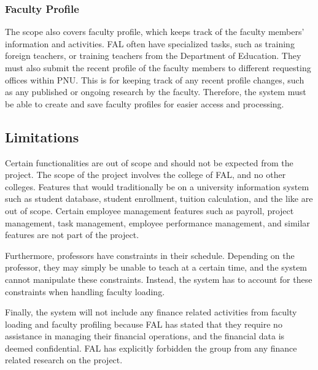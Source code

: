 \subsubsection{Faculty Profile}
The scope also covers faculty profile, which keeps track of the faculty members' information and activities. FAL often have specialized tasks, such as training foreign teachers, or training teachers from the Department of Education. They must also submit the recent profile of the faculty members to different requesting offices within PNU. This is for keeping track of any recent profile changes, such as any published or ongoing research by the faculty. Therefore, the system must be able to create and save faculty profiles for easier access and processing.

\subsection{Limitations}
Certain functionalities are out of scope and should not be expected from the project. The scope of the project involves the college of FAL, and no other colleges. Features that would traditionally be on a university information system such as student database, student enrollment, tuition calculation, and the like are out of scope. Certain employee management features such as payroll, project management, task management, employee performance management, and similar features are not part of the project.

Furthermore, professors have constraints in their schedule. Depending on the professor, they may simply be unable to teach at a certain time, and the system cannot manipulate these constraints. Instead, the system has to account for these constraints when handling faculty loading.

Finally, the system will not include any finance related activities from faculty loading and faculty profiling because FAL has stated that they require no assistance in managing their financial operations, and the financial data is deemed confidential.  FAL has explicitly forbidden the group from any finance related research on the project.